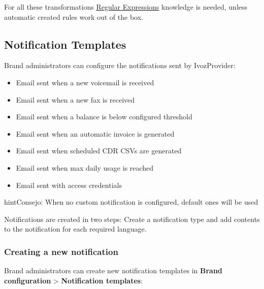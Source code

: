 \documentclass[letterpaper,10pt,spanish]{sphinxmanual}
\begin{document}
For all these transformations \href{http://php.net/manual/en/reference.pcre.pattern.syntax.php}{Regular Expressions} knowledge
is needed, unless automatic created rules work out of the box.
\label{administration_portal/brand/settings/notification_templates:notification-templates}

\subsection{Notification Templates}
\label{administration_portal/brand/settings/notification_templates:id2}\label{administration_portal/brand/settings/notification_templates::doc}\label{administration_portal/brand/settings/notification_templates:notification-templates}\label{administration_portal/brand/settings/notification_templates:id1}
Brand administrators can configure the notifications sent by IvozProvider:
\begin{itemize}
\item {} 
Email sent when a new voicemail is received

\item {} 
Email sent when a new fax is received

\item {} 
Email sent when a balance is below configured threshold

\item {} 
Email sent when an automatic invoice is generated

\item {} 
Email sent when scheduled CDR CSVs are generated

\item {} 
Email sent when max daily usage is reached

\item {} 
Email sent with access credentials

\end{itemize}

\begin{notice}{hint}{Consejo:}
When no custom notification is configured, default ones will be used
\end{notice}

Notifications are created in two steps: Create a notification type and add contents to the notification for each
required language.


\subsubsection{Creating a new notification}
\label{administration_portal/brand/settings/notification_templates:creating-a-new-notification}
Brand administrators can create new notification templates in \textbf{Brand configuration} \textgreater{} \textbf{Notification templates}:
\end{document}
